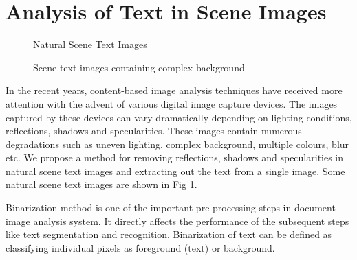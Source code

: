 \section{Analysis of Text in Scene Images}
\begin{figure}[t]
\centering
{}
\caption
{Natural Scene Text Images}
\label{fig:scenetext}
\end{figure}
\begin{figure}[t]
\centering
{}
\caption
{Scene text images containing complex background}
\label{fig:textchallenge}
\end{figure}

In the recent years, content-based image analysis techniques have received more attention with the advent of various digital image capture devices.
The images captured by these devices can vary dramatically depending on lighting conditions, reflections, shadows and specularities.
These images contain numerous degradations such as uneven lighting, complex background, multiple colours, blur etc.
We propose a method for removing reflections, shadows and specularities in natural scene text images and extracting out the text from a single image. 
Some natural scene text images are shown in Fig \ref{fig:scenetext}.	

Binarization method is one of the important pre-processing steps in document image analysis system. 
It directly affects the performance of the subsequent steps like text segmentation and recognition.
Binarization of text can be defined as classifying individual pixels as foreground (text) or background. 

